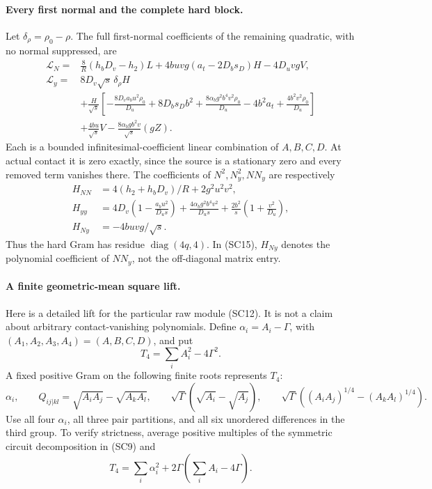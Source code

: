 \paragraph{Every first normal and the complete hard block.}
Let $\delta_\rho=\rho_0-\rho$. The full first-normal coefficients
of the remaining quadratic, with no normal suppressed, are
\begin{align*}
 \mathcal L_N={}&\frac8R(h_bD_v-h_2)L
       +4buvg(a_t-2D_bs_D)H-4D_uvgV,\\
 \mathcal L_y={}&8D_v\sqrt{s}\,\delta_\rho H\\
 &+\frac H{\sqrt s}\left[
 -\frac{8D_va_bu^2\rho_0}{D_u}+8D_bs_Db^2
 +\frac{8\alpha_bg^2b^4v^2\rho_0}{D_u}
 -4b^2a_t+\frac{4b^2v^2\rho_0}{D_u}\right]\\
 &+\frac{4bu}{\sqrt{s}}V
       -\frac{8\alpha_bgb^2v}{\sqrt{s}}(gZ).
                                                        \tag{SC14}
\end{align*}
Each is a bounded infinitesimal-coefficient linear combination of
$A,B,C,D$. At actual contact it is zero exactly, since the source
is a stationary zero and every removed term vanishes there.
The coefficients of $N^2,N_y^2,NN_y$ are respectively
\[
\begin{aligned}
 H_{NN}&=4(h_2+h_bD_v)/R+2g^2u^2v^2,\\
 H_{yy}&=4D_v\left(1-\frac{a_bu^2}{D_us}\right)
       +\frac{4\alpha_bg^2b^4v^2}{D_us}
       +\frac{2b^2}{s}\left(1+\frac{v^2}{D_u}\right),\\
 H_{Ny}&=-4buvg/\sqrt{s}.
\end{aligned}                                                     \tag{SC15}
\]
Thus the hard Gram has residue $\operatorname{diag}(4q,4)$.
In (SC15), $H_{Ny}$ denotes the polynomial coefficient of $NN_y$,
not the off-diagonal matrix entry.

\paragraph{A finite geometric-mean square lift.}
Here is a detailed lift for the particular raw module (SC12).
It is not a claim about arbitrary contact-vanishing polynomials.
Define $\alpha_i=A_i-\Gamma$, with
$(A_1,A_2,A_3,A_4)=(A,B,C,D)$, and put
\[
 T_4=\sum_iA_i^2-4\Gamma^2.
\]
A fixed positive Gram on the following finite roots represents $T_4$:
\[
 \alpha_i,\qquad
 Q_{ij|kl}=\sqrt{A_iA_j}-\sqrt{A_kA_l},\qquad
 \sqrt\Gamma(\sqrt{A_i}-\sqrt{A_j}),\qquad
 \sqrt\Gamma((A_iA_j)^{1/4}-(A_kA_l)^{1/4}).          \tag{SC16}
\]
Use all four $\alpha_i$, all three pair partitions, and all six
unordered differences in the third group. To verify strictness, average
positive multiples of the symmetric circuit decomposition in (SC9) and
\[
 T_4=\sum_i\alpha_i^2+2\Gamma\left(\sum_iA_i-4\Gamma\right).
\]

